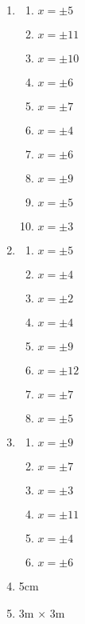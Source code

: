 \documentclass[a4paper,12pt]{article}
\begin{document}
\begin{enumerate}
\item
    \begin{multicols}{2}
    \begin{enumerate}
    \item $x = \pm 5$
    \item $x = \pm 11$
    \item $x = \pm 10$
    \item $x = \pm 6$
    \item $x = \pm 7$
    \item $x = \pm 4$
    \item $x = \pm 6$
    \item $x = \pm 9$
    \item $x = \pm 5$
    \item $x = \pm 3$
    \end{enumerate}
    \end{multicols}

\item
    \begin{multicols}{2}
    \begin{enumerate}
    \item $x = \pm 5$
    \item $x = \pm 4$
    \item $x = \pm 2$
    \item $x = \pm 4$
    \item $x = \pm 9$
    \item $x = \pm 12$
    \item $x = \pm 7$
    \item $x = \pm 5$
    \end{enumerate}
    \end{multicols}

\item
    \begin{multicols}{2}
    \begin{enumerate}
    \item $x = \pm 9$
    \item $x = \pm 7$
    \item $x = \pm 3$
    \item $x = \pm 11$
    \item $x = \pm 4$
    \item $x = \pm 6$
    \end{enumerate}
    \end{multicols}

\item 5cm

\item 3m $\times$ 3m


\end{enumerate}
\end{document}
